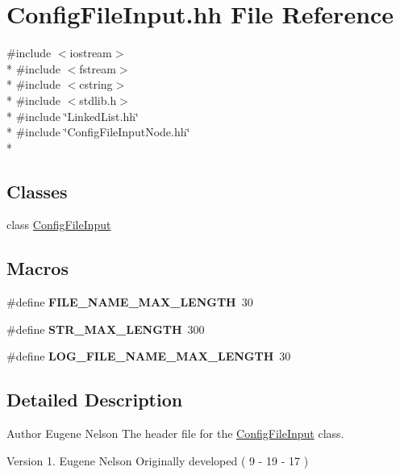 \hypertarget{_config_file_input_8hh}{\section{Config\-File\-Input.\-hh File Reference}
\label{_config_file_input_8hh}
}
{\ttfamily \#include $<$iostream$>$}\\*
{\ttfamily \#include $<$fstream$>$}\\*
{\ttfamily \#include $<$cstring$>$}\\*
{\ttfamily \#include $<$stdlib.\-h$>$}\\*
{\ttfamily \#include \char`\"{}Linked\-List.\-hh\char`\"{}}\\*
{\ttfamily \#include \char`\"{}Config\-File\-Input\-Node.\-hh\char`\"{}}\\*
\subsection*{Classes}
\begin{DoxyCompactItemize}
\item 
class \hyperlink{class_config_file_input}{Config\-File\-Input}
\end{DoxyCompactItemize}
\subsection*{Macros}
\begin{DoxyCompactItemize}
\item 
\hypertarget{_config_file_input_8hh_a362b6be1bbf34c4d98739b9196fbe148}{\#define {\bfseries F\-I\-L\-E\-\_\-\-N\-A\-M\-E\-\_\-\-M\-A\-X\-\_\-\-L\-E\-N\-G\-T\-H}~30}\label{_config_file_input_8hh_a362b6be1bbf34c4d98739b9196fbe148}

\item 
\hypertarget{_config_file_input_8hh_ada55f6bc0463a1a51589c6f6755fd29a}{\#define {\bfseries S\-T\-R\-\_\-\-M\-A\-X\-\_\-\-L\-E\-N\-G\-T\-H}~300}\label{_config_file_input_8hh_ada55f6bc0463a1a51589c6f6755fd29a}

\item 
\hypertarget{_config_file_input_8hh_ae580f492708a546d4bd0cbecda9a2d12}{\#define {\bfseries L\-O\-G\-\_\-\-F\-I\-L\-E\-\_\-\-N\-A\-M\-E\-\_\-\-M\-A\-X\-\_\-\-L\-E\-N\-G\-T\-H}~30}\label{_config_file_input_8hh_ae580f492708a546d4bd0cbecda9a2d12}

\end{DoxyCompactItemize}


\subsection{Detailed Description}
\begin{DoxyAuthor}{Author}
Eugene Nelson  The header file for the \hyperlink{class_config_file_input}{Config\-File\-Input} class. 
\end{DoxyAuthor}
\begin{DoxyVersion}{Version}
1. Eugene Nelson Originally developed ( 9 -\/ 19 -\/ 17 ) 
\end{DoxyVersion}
